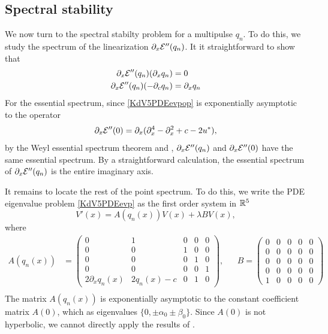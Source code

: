 \documentclass[thesis.tex]{subfiles}
\begin{document}
\subsection{Spectral stability}

We now turn to the spectral stabilty problem for a multipulse $q_n$. To do this, we study the spectrum of the linearization $\partial_x \mathcal{E}''(q_n)$. It it straightforward to show that 
\begin{align*}
\partial_x \mathcal{E}''(q_n) (\partial_x q_n) &= 0 \\
\partial_x \mathcal{E}''(q_n) (-\partial_c q_n) &= \partial_x q_n
\end{align*}
For the essential spectrum, since \cref{KdV5PDEevpop} is exponentially asymptotic to the operator 
\[
\partial_x \mathcal{E}''(0) = 
\partial_x(\partial_x^4 - \partial_x^2 + c - 2 u^*),
\]
by the Weyl essential spectrum theorem \cite[Theorem 2.2.6]{Kapitula2013} and \cite[Theorem 3.1.11]{Kapitula2013}, $\partial_x \mathcal{E}''(q_n)$ and $\partial_x \mathcal{E}''(0)$ have the same essential spectrum. By a straightforward calculation, the essential spectrum of $\partial_x \mathcal{E}''(q_n)$ is the entire imaginary axis.

It remains to locate the rest of the point spectrum. To do this, we write the PDE eigenvalue problem \cref{KdV5PDEevp} as the first order system in $\mathbb{R}^5$
\begin{equation}\label{KdV5PDEevp2}
V'(x) = A(q_n(x))V(x) + \lambda B V(x),
\end{equation}
where
\begin{align*}
A(q_n(x)) &= \begin{pmatrix}0 & 1 & 0 & 0 & 0 \\0 & 0 & 1 & 0 & 0 \\0 & 0 & 0 & 1 & 0 \\0 & 0 & 0 & 0 & 1 \\
2 \partial_x q_n(x) & 2 q_n(x) - c & 0 & 1 & 0 \end{pmatrix}, &&
B = \begin{pmatrix}0 & 0 & 0 & 0 & 0 \\0 & 0 & 0 & 0 & 0 \\0 & 0 & 0 & 0 & 0 \\0 & 0 & 0 & 0 & 0 \\
1 & 0 & 0 & 0 & 0 \end{pmatrix} \\
\end{align*}
The matrix $A(q_n(x))$ is exponentially asymptotic to the constant coefficient matrix $A(0)$, which as eigenvalues $\{ 0, \pm \alpha_0 \pm \beta_0 \}$. Since $A(0)$ is not hyperbolic, we cannot directly apply the results of \cite{Sandstede1998}. 
\end{document}
